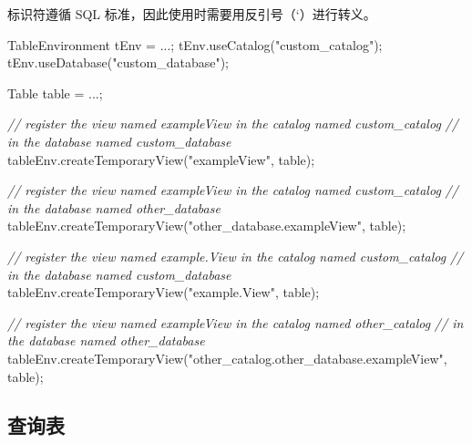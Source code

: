 \documentclass[cn,11pt,chinese]{elegantbook}
\newenvironment{Shaded}{}{}
\newcommand{\CommentTok}[1]{\textcolor[rgb]{0.38,0.63,0.69}{\textit{#1}}}
\newcommand{\FunctionTok}[1]{\textcolor[rgb]{0.02,0.16,0.49}{#1}}
\newcommand{\NormalTok}[1]{#1}
\newcommand{\StringTok}[1]{\textcolor[rgb]{0.25,0.44,0.63}{#1}}
\begin{document}
标识符遵循 SQL 标准，因此使用时需要用反引号（`）进行转义。

\begin{Shaded}
\begin{Highlighting}[]
\NormalTok{TableEnvironment tEnv = ...;}
\NormalTok{tEnv.}\FunctionTok{useCatalog}\NormalTok{(}\StringTok{"custom\_catalog"}\NormalTok{);}
\NormalTok{tEnv.}\FunctionTok{useDatabase}\NormalTok{(}\StringTok{"custom\_database"}\NormalTok{);}

\NormalTok{Table table = ...;}

\CommentTok{// register the view named \textquotesingle{}exampleView\textquotesingle{} in the catalog named \textquotesingle{}custom\_catalog\textquotesingle{}}
\CommentTok{// in the database named \textquotesingle{}custom\_database\textquotesingle{} }
\NormalTok{tableEnv.}\FunctionTok{createTemporaryView}\NormalTok{(}\StringTok{"exampleView"}\NormalTok{, table);}

\CommentTok{// register the view named \textquotesingle{}exampleView\textquotesingle{} in the catalog named \textquotesingle{}custom\_catalog\textquotesingle{}}
\CommentTok{// in the database named \textquotesingle{}other\_database\textquotesingle{} }
\NormalTok{tableEnv.}\FunctionTok{createTemporaryView}\NormalTok{(}\StringTok{"other\_database.exampleView"}\NormalTok{, table);}

\CommentTok{// register the view named \textquotesingle{}example.View\textquotesingle{} in the catalog named \textquotesingle{}custom\_catalog\textquotesingle{}}
\CommentTok{// in the database named \textquotesingle{}custom\_database\textquotesingle{} }
\NormalTok{tableEnv.}\FunctionTok{createTemporaryView}\NormalTok{(}\StringTok{"\textasciigrave{}example.View\textasciigrave{}"}\NormalTok{, table);}

\CommentTok{// register the view named \textquotesingle{}exampleView\textquotesingle{} in the catalog named \textquotesingle{}other\_catalog\textquotesingle{}}
\CommentTok{// in the database named \textquotesingle{}other\_database\textquotesingle{} }
\NormalTok{tableEnv.}\FunctionTok{createTemporaryView}\NormalTok{(}\StringTok{"other\_catalog.other\_database.exampleView"}\NormalTok{, table);}
\end{Highlighting}
\end{Shaded}

\hypertarget{ux67e5ux8be2ux8868}{%
\subsection{查询表}\label{ux67e5ux8be2ux8868}}
\end{document}

